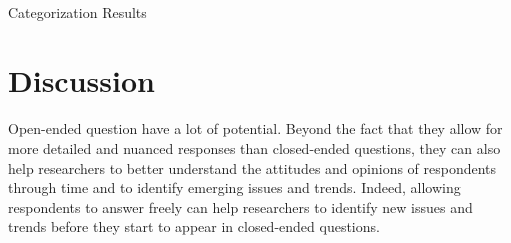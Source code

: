 \documentclass[
  authoryear,
  preprint,
  3p]{elsarticle}
\makeatletter
\let\oldparagraph\paragraph
\renewcommand{\paragraph}{
    \@ifstar
      \xxxParagraphStar
      \xxxParagraphNoStar
  }
\newcommand{\xxxParagraphStar}[1]{\oldparagraph*{#1}\mbox{}}
\newcommand{\xxxParagraphNoStar}[1]{\oldparagraph{#1}\mbox{}}
\newenvironment{Shaded}{\begin{snugshade}}{\end{snugshade}}
\newcommand{\NormalTok}[1]{\textcolor[rgb]{0.00,0.23,0.31}{#1}}
\newcommand{\SpecialCharTok}[1]{\textcolor[rgb]{0.37,0.37,0.37}{#1}}
\newcommand{\StringTok}[1]{\textcolor[rgb]{0.13,0.47,0.30}{#1}}
\makeatother
\begin{document}
\begin{Shaded}
\end{Shaded}

\paragraph{Categorization Results}\label{categorization-results-1}

\section{Discussion}\label{discussion}

Open-ended question have a lot of potential. Beyond the fact that they
allow for more detailed and nuanced responses than closed-ended
questions, they can also help researchers to better understand the
attitudes and opinions of respondents through time and to identify
emerging issues and trends. Indeed, allowing respondents to answer
freely can help researchers to identify new issues and trends before
they start to appear in closed-ended questions.
\end{document}

